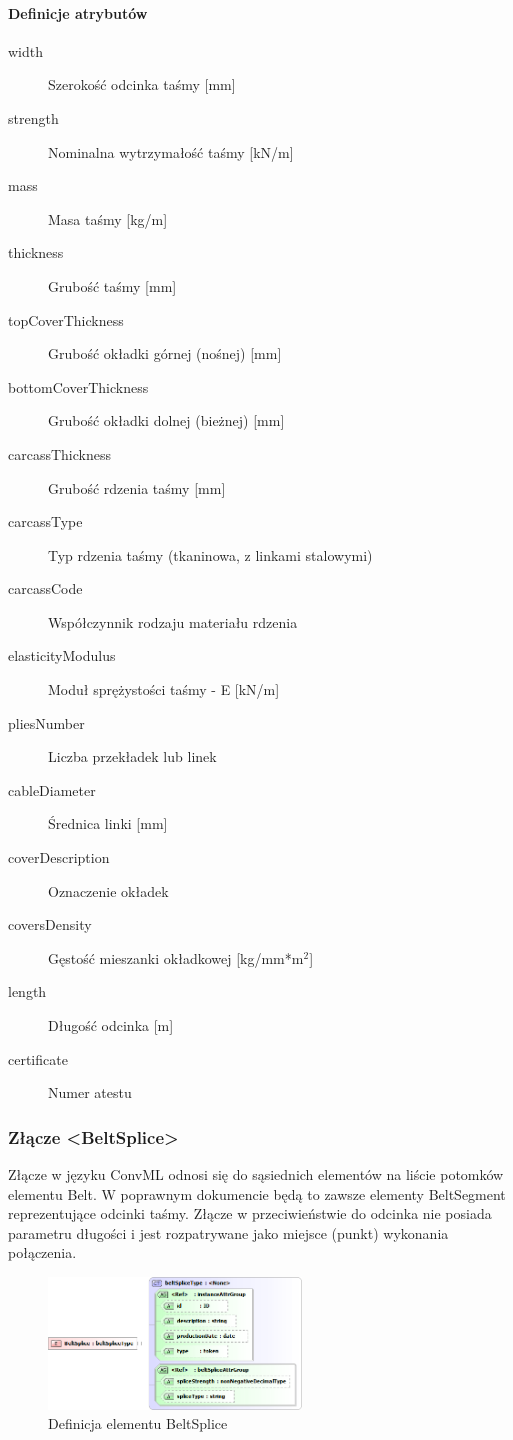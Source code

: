 \documentclass[12pt,a4paper]{article}
\begin{document}
\paragraph{Definicje atrybutów}
\begin{description}
\item[width] Szerokość odcinka taśmy [mm]
\item[strength] Nominalna wytrzymałość taśmy [kN/m]
\item[mass] Masa taśmy [kg/m]
\item[thickness] Grubość taśmy [mm]
\item[topCoverThickness] Grubość okładki górnej (nośnej) [mm]
\item[bottomCoverThickness] Grubość okładki dolnej (bieżnej) [mm]
\item[carcassThickness] Grubość rdzenia taśmy [mm]
\item[carcassType] Typ rdzenia taśmy (tkaninowa, z linkami stalowymi)
\item[carcassCode] Współczynnik rodzaju materiału rdzenia
\item[elasticityModulus] Moduł sprężystości taśmy - E [kN/m]
\item[pliesNumber] Liczba przekładek lub linek
\item[cableDiameter] Średnica linki [mm]
\item[coverDescription] Oznaczenie okładek
\item[coversDensity] Gęstość mieszanki okładkowej [kg/mm*m$^2$]
\item[length] Długość odcinka [m]
\item[certificate] Numer atestu
\end{description}


\subsubsection{Złącze <BeltSplice>}
Złącze w języku ConvML odnosi się do sąsiednich elementów na liście potomków
elementu Belt.  W poprawnym dokumencie będą to zawsze elementy BeltSegment
reprezentujące odcinki taśmy.  Złącze w przeciwieństwie do odcinka nie posiada
parametru długości i jest rozpatrywane jako miejsce (punkt) wykonania
połączenia.

\begin{figure}[h]
  \centering
  \includegraphics[width=0.6\textwidth]{png/belt_splice_xsd2}
  \caption{Definicja elementu BeltSplice}
  \label{fig:beltSplice-xsd}
\end{figure}
\end{document}
